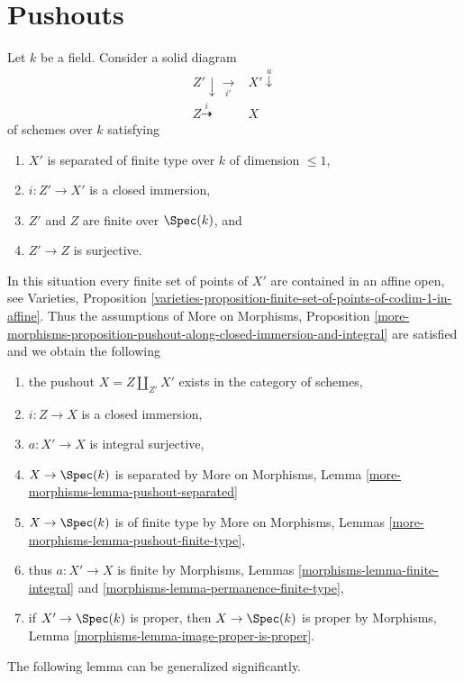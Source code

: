 \section{Pushouts}
\label{curves-section-pushouts}
Let $k$ be a field. Consider a solid diagram
$$
\begin{array}{cc}Z' \downarrow\underset{i'}{\longrightarrow} & X' \overset{a}{\downarrow} \\ Z \overset{i}{\dashrightarrow} & X\end{array}
$$
of schemes over $k$ satisfying
\begin{enumerate}
\item[(a)] $X'$ is separated of finite type over $k$ of dimension $\leq 1$,
\item[(b)] $i : Z' \to X'$ is a closed immersion,
\item[(c)] $Z'$ and $Z$ are finite over $\Spec(k)$, and
\item[(d)] $Z' \to Z$ is surjective.
\end{enumerate}
In this situation every finite set of points of $X'$ are contained
in an affine open, see Varieties, Proposition
\ref{varieties-proposition-finite-set-of-points-of-codim-1-in-affine}.
Thus the assumptions of
More on Morphisms, Proposition
\ref{more-morphisms-proposition-pushout-along-closed-immersion-and-integral}
are satisfied and we obtain the following
\begin{enumerate}
\item the pushout $X = Z \amalg_{Z'} X'$ exists in the category of schemes,
\item $i : Z \to X$ is a closed immersion,
\item $a : X' \to X$ is integral surjective,
\item $X \to \Spec(k)$ is separated by More on Morphisms, Lemma
\ref{more-morphisms-lemma-pushout-separated}
\item $X \to \Spec(k)$ is of finite type by
More on Morphisms, Lemmas \ref{more-morphisms-lemma-pushout-finite-type},
\item thus $a : X' \to X$ is finite by
Morphisms, Lemmas \ref{morphisms-lemma-finite-integral} and
\ref{morphisms-lemma-permanence-finite-type},
\item if $X' \to \Spec(k)$ is proper, then $X \to \Spec(k)$ is proper
by Morphisms, Lemma \ref{morphisms-lemma-image-proper-is-proper}.
\end{enumerate}

The following lemma can be generalized significantly.

